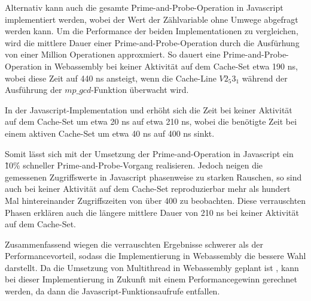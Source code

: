 Alternativ kann auch die gesamte Prime-and-Probe-Operation in Javascript implementiert werden, wobei der Wert der Zählvariable ohne Umwege abgefragt werden kann.
Um die Performance der beiden Implementationen zu vergleichen, wird die mittlere Dauer einer Prime-and-Probe-Operation durch die Ausfürhung von einer Million Operationen approxmiert.
So dauert eine Prime-and-Probe-Operation in Webassembly bei keiner Aktivität auf dem Cache-Set etwa 190 ns, wobei diese Zeit auf 440 ns ansteigt, wenn die Cache-Line $V2_5 3_1$ während der Ausführung der $mp\_gcd$-Funktion überwacht wird.

In der Javascript-Implementation und erhöht sich die Zeit bei keiner Aktivität auf dem Cache-Set um etwa 20 ns auf etwa 210 ns, wobei die benötigte Zeit bei einem aktiven Cache-Set um etwa 40 ns auf 400 ns sinkt.

Somit lässt sich mit der Umsetzung der Prime-and-Operation in Javascript ein \~ 10\% schneller Prime-and-Probe-Vorgang realisieren.
Jedoch neigen die gemessenen Zugriffswerte in Javascript phasenweise zu starken Rauschen, so sind auch bei keiner Aktivität auf dem Cache-Set reproduzierbar mehr als hundert Mal hintereinander Zugriffszeiten von über 400 zu beobachten.
Diese verrauschten Phasen erklären auch die längere mittlere Dauer von 210 ns bei keiner Aktivität auf dem Cache-Set.

Zusammenfassend wiegen die verrauschten Ergebnisse schwerer als der Performancevorteil, sodass die Implementierung in Webassembly die bessere Wahl darstellt.
Da die Umsetzung von Multithread in Webassembly geplant ist \cite{WebassemblyThreads}, kann bei dieser Implementierung in Zukunft mit einem Performancegewinn gerechnet werden, da dann die Javascript-Funktionsaufrufe entfallen.



